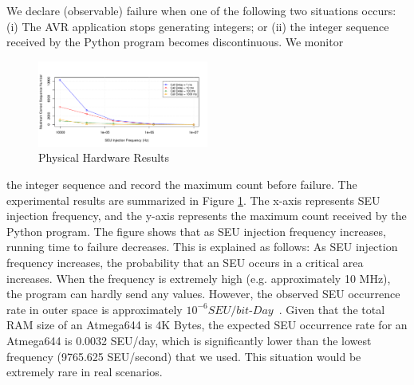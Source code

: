We declare (observable) failure when one of the following two situations occurs: (i) The AVR application stops generating integers; or (ii) the integer sequence received by the Python program becomes discontinuous. We monitor 
\begin{figure}
	\vspace{-30pt}
	\begin{center}
		\includegraphics[width=0.50\textwidth]{figures/experiment1.pdf}
	\end{center}
	\vspace{-15pt}
	\caption{Physical Hardware Results}
	\label{fig:exp1_result}
	\vspace{-20pt}
\end{figure}
the integer sequence and record the maximum count before failure. The experimental results are summarized in Figure \ref{fig:exp1_result}. The x-axis represents SEU injection frequency, and the y-axis represents the maximum count received by the Python program. The figure shows that as SEU injection frequency increases, running time to failure decreases. This is explained as follows: As SEU injection frequency increases, the probability that an SEU occurs in a critical area increases. When the frequency is extremely high (e.g. approximately 10 MHz), the program can hardly send any values. However, the observed SEU occurrence rate in outer space is approximately $10^{-6}SEU/bit$-$Day$~\cite{underwood1992observations}. Given that the total RAM size of an Atmega644 is 4K Bytes, the expected SEU occurrence rate for an Atmega644 is 0.0032 SEU/day, which is significantly lower than the lowest frequency (9765.625 SEU/second) that we used. This situation would be extremely rare in real scenarios.
